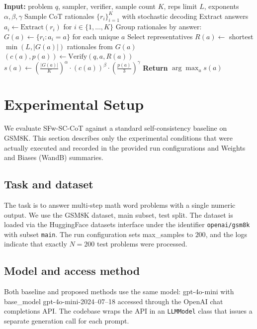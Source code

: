 \documentclass[journal,article,accept,pdftex,moreauthors]{Definitions/mdpi}
\begin{document}
\begin{algorithm}[H]
\caption{SFw-SC-CoT (Selective Falsification-Weighted Self-Consistency)}
\begin{algorithmic}[1]
\State{} \textbf{Input:} problem $q$, sampler, verifier, sample count $K$, reps limit $L$, exponents $\alpha,\beta,\gamma$
\State{} Sample CoT rationales ${\{r_i\}}_{i=1}^{K}$ with stochastic decoding
\State{} Extract answers $a_i \leftarrow \mathrm{Extract}(r_i)$ for $i \in \{1,\ldots,K\}$
\State{} Group rationales by answer: $G(a) \leftarrow \{r_i : a_i = a\}$ for each unique $a$
  \State{} Select representatives $R(a) \leftarrow$ shortest $\min(L, |G(a)|)$ rationales from $G(a)$
  \State{} $(c(a), p(a)) \leftarrow \mathrm{Verify}(q, a, R(a))$ 
  \State{} $s(a) \leftarrow {\left(\frac{|G(a)|}{K}\right)}^{{\alpha}} \cdot {\left(c(a)\right)}^{{\beta}} \cdot {\left(\frac{p(a)}{3}\right)}^{{\gamma}}$
\EndFor{}
\State{} \textbf{Return} $\arg\max_a s(a)$
\end{algorithmic}
\end{algorithm}

\section{Experimental Setup}

We evaluate SFw-SC-CoT against a standard self-consistency baseline on GSM8K. This section describes only the experimental conditions that were actually executed and recorded in the provided run configurations and Weights and Biases (WandB) summaries.

\subsection{Task and dataset}
The task is to answer multi-step math word problems with a single numeric output. We use the GSM8K dataset, main subset, test split. The dataset is loaded via the HuggingFace datasets interface under the identifier \texttt{openai/gsm8k} with subset \texttt{main}. The run configuration sets max\_samples to $200$, and the logs indicate that exactly $N = 200$ test problems were processed.

\subsection{Model and access method}
Both baseline and proposed methods use the same model: gpt-4o-mini with base\_model gpt-4o-mini-2024--07--18 accessed through the OpenAI chat completions API\@. The codebase wraps the API in an \texttt{LLMModel} class that issues a separate generation call for each prompt.
\end{document}
